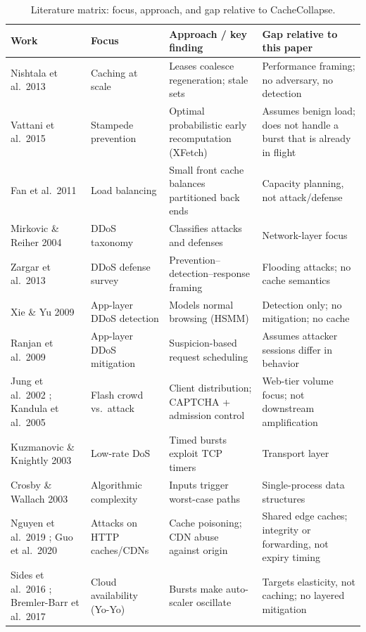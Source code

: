 \begin{table}[p]
\centering
\caption{Literature matrix: focus, approach, and gap relative to CacheCollapse.}
\label{tab:litmatrix}
\footnotesize
\begin{tabularx}{\linewidth}{@{}L{2.7cm}L{2.6cm}YY@{}}
\toprule
Work & Focus & Approach / key finding & Gap relative to this paper \\
\midrule
Nishtala et al.\ 2013 \cite{nishtala2013} & Caching at scale & Leases coalesce regeneration; stale sets & Performance framing; no adversary, no detection \\
Vattani et al.\ 2015 \cite{vattani2015} & Stampede prevention & Optimal probabilistic early recomputation (XFetch) & Assumes benign load; does not handle a burst that is already in flight \\
Fan et al.\ 2011 \cite{fan2011} & Load balancing & Small front cache balances partitioned back ends & Capacity planning, not attack/defense \\
Mirkovic \& Reiher 2004 \cite{mirkovic2004} & DDoS taxonomy & Classifies attacks and defenses & Network-layer focus \\
Zargar et al.\ 2013 \cite{zargar2013} & DDoS defense survey & Prevention--detection--response framing & Flooding attacks; no cache semantics \\
Xie \& Yu 2009 \cite{xie2009} & App-layer DDoS detection & Models normal browsing (HSMM) & Detection only; no mitigation; no cache \\
Ranjan et al.\ 2009 \cite{ranjan2009} & App-layer DDoS mitigation & Suspicion-based request scheduling & Assumes attacker sessions differ in behavior \\
Jung et al.\ 2002 \cite{jung2002}; Kandula et al.\ 2005 \cite{kandula2005} & Flash crowd vs.\ attack & Client distribution; CAPTCHA + admission control & Web-tier volume focus; not downstream amplification \\
Kuzmanovic \& Knightly 2003 \cite{kuzmanovic2003} & Low-rate DoS & Timed bursts exploit TCP timers & Transport layer \\
Crosby \& Wallach 2003 \cite{crosby2003} & Algorithmic complexity & Inputs trigger worst-case paths & Single-process data structures \\
Nguyen et al.\ 2019 \cite{nguyen2019}; Guo et al.\ 2020 \cite{guo2020} & Attacks on HTTP caches/CDNs & Cache poisoning; CDN abuse against origin & Shared edge caches; integrity or forwarding, not expiry timing \\
Sides et al.\ 2016 \cite{sides2016}; Bremler-Barr et al.\ 2017 \cite{bremlerbarr2017} & Cloud availability (Yo-Yo) & Bursts make auto-scaler oscillate & Targets elasticity, not caching; no layered mitigation \\

\end{tabularx}
\end{table}
